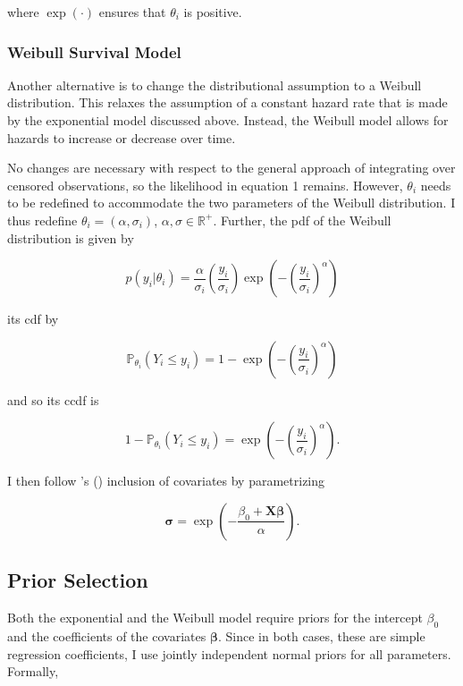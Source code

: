 \documentclass[11pt]{article}
\newcommand\possecite[1]{\citeauthor{#1}'s (\citeyear{#1})}
\begin{document}
where $\exp(\cdot)$ ensures that $\theta_i$ is positive.

\subsubsection{Weibull Survival Model}
Another alternative is to change the distributional assumption to a Weibull distribution. This relaxes the assumption of a constant hazard rate that is made by the exponential model discussed above. Instead, the Weibull model allows for hazards to increase or decrease over time. 

No changes are necessary with respect to the general approach of integrating over censored observations, so the likelihood in equation 1 remains. However, $\theta_i$ needs to be redefined to accommodate the two parameters of the Weibull distribution. I thus redefine $\theta_i = (\alpha, \sigma_i)$, $\alpha, \sigma \in \mathbb{R}^+$. Further, the pdf of the Weibull distribution is given by 

\begin{equation*}
    p(y_i|\theta_i) = \frac{\alpha}{\sigma_i} \left(\frac{y_i}{\sigma_i}\right) \exp\left(-\left(\frac{y_i}{\sigma_i}\right)^{\alpha}\right)
\end{equation*}

its cdf by

\begin{equation*}
    \mathbb{P}_{\theta_i}(Y_i \leq y_i) = 1 - \exp\left(-\left(\frac{y_i}{\sigma_i}\right)^{\alpha}\right)
\end{equation*}

and so its ccdf is

\begin{equation*}
    1 - \mathbb{P}_{\theta_i}(Y_i \leq y_i) = \exp\left(-\left(\frac{y_i}{\sigma_i}\right)^{\alpha}\right).
\end{equation*}

I then follow \possecite{biostan2021} inclusion of covariates by parametrizing 

\begin{equation*}
    \bm{\sigma} = \exp\left(-\frac{\beta_0 + \bm{X}\bm{\beta}}{\alpha}\right).
\end{equation*}


\subsection{Prior Selection}
Both the exponential and the Weibull model require priors for the intercept $\beta_0$ and the coefficients of the covariates $\bm\beta$. Since in both cases, these are simple regression coefficients, I use jointly independent normal priors for all parameters. Formally, 
\end{document}
